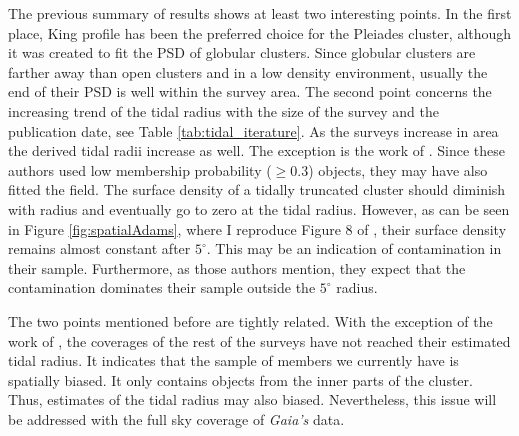 The previous summary of results shows at least two interesting points. In the first place, King profile \citep{King1962} has been the preferred choice for the Pleiades cluster, although it was created to fit the PSD of globular clusters. Since globular clusters are farther away than open clusters and in a low density environment, usually the end of their PSD is well within the survey area. The second point concerns the increasing trend of the tidal radius with the size of the survey and the publication date, see Table \ref{tab:tidal_iterature}. As the surveys increase in area the derived tidal radii increase as well. The exception is the work of \citet{Adams2001}. Since these authors used low membership probability ($\geq0.3$) objects, they may have also fitted the field. The surface density of a tidally truncated cluster should diminish with radius and eventually go to zero at the tidal radius. However, as can be seen in Figure \ref{fig:spatialAdams}, where I reproduce Figure 8 of \citet{Adams2001}, their surface density remains almost constant after $5^{\circ}$. This may be an indication of contamination in their sample. Furthermore, as those authors mention, they expect that the contamination dominates their sample outside the $5^{\circ}$ radius.

The two points mentioned before are tightly related. With the exception of the work of \citet{Adams2001}, the coverages of the rest of the surveys have not reached their estimated tidal radius. It indicates that the sample of members we currently have is spatially biased. It only contains objects from the inner parts of the cluster. Thus, estimates of the tidal radius may also biased. Nevertheless, this issue will be addressed with the full sky coverage of \emph{Gaia's} data.

